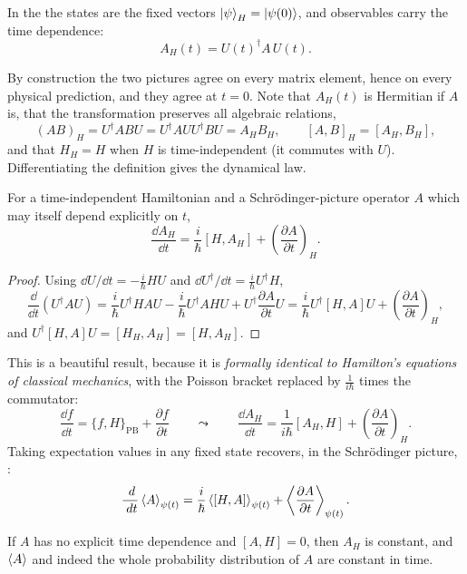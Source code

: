 \documentclass[a4paper]{scrartcl}
\begin{document}
\begin{definition}
    In the  the states are the fixed vectors $\ket{\psi}_H = \ket{\psi(0)}$, and observables carry the time dependence:
    $$
    A_H(t) = U(t)^\dagger A \, U(t).
    $$
\end{definition}

By construction the two pictures agree on every matrix element, hence on every physical prediction, and they agree at $t=0$. Note that $A_H(t)$ is Hermitian if $A$ is, that the transformation preserves all algebraic relations,
$$
(AB)_H = U^\dagger A B U = U^\dagger A U U^\dagger B U = A_H B_H, \qquad [A,B]_H = [A_H, B_H],
$$
and that $H_H = H$ when $H$ is time-independent (it commutes with $U$). Differentiating the definition gives the dynamical law.

\begin{theorem}
    For a time-independent Hamiltonian and a Schr\"odinger-picture operator $A$ which may itself depend explicitly on $t$,
    $$
    \frac{\dd A_H}{\dd t} = \frac{i}{\hbar}\left[ H, A_H \right] + \left( \frac{\partial A}{\partial t} \right)_{\!H}.
    $$
\end{theorem}
\begin{proof}
    Using $\dd U/\dd t = -\frac{i}{\hbar}HU$ and $\dd U^\dagger/\dd t = \frac{i}{\hbar}U^\dagger H$,
    $$
    \frac{\dd}{\dd t}\left( U^\dagger A U \right) = \frac{i}{\hbar}U^\dagger H A U - \frac{i}{\hbar} U^\dagger A H U + U^\dagger \frac{\partial A}{\partial t} U = \frac{i}{\hbar}U^\dagger[H,A]U + \left(\frac{\partial A}{\partial t}\right)_H,
    $$
    and $U^\dagger[H,A]U = [H_H, A_H] = [H,A_H]$. \qedhere
\end{proof}

This is a beautiful result, because it is \emph{formally identical to Hamilton's equations of classical mechanics}, with the Poisson bracket replaced by $\frac{1}{i\hbar}$ times the commutator:
$$
\frac{\dd f}{\dd t} = \{f, H\}_{\mathrm{PB}} + \frac{\partial f}{\partial t} \qquad \leadsto \qquad \frac{\dd A_H}{\dd t} = \frac{1}{i\hbar}[A_H, H] + \left(\frac{\partial A}{\partial t}\right)_H.
$$
Taking expectation values in any fixed state recovers, in the Schr\"odinger picture, :
$$
\frac{\; d}{\; d t}\expval{A}_{\psi(t)} = \frac{i}{\hbar}\expval{[H,A]}_{\psi(t)} + \expval{\frac{\partial A}{\partial t}}_{\psi(t)}.
$$

\begin{corollary}
    If $A$ has no explicit time dependence and $[A, H] = 0$, then $A_H$ is constant, and $\expval{A}$ and indeed the whole probability distribution of $A$ are constant in time.
\end{corollary}
\end{document}
